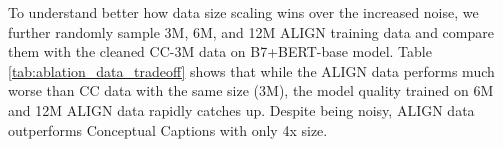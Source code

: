 \documentclass{article}
\begin{document}
\begin{table}[h!]
\vspace{-5mm}
    \centering
    \small
    \caption{Ablation study of different training datasets.}
    \label{tab:ablation_data}
    \vspace{1mm}
\vspace{-3mm}
\end{table}

To understand better how data size scaling wins over the increased noise, we further randomly sample 3M, 6M, and 12M ALIGN training data and compare them with the cleaned CC-3M data on B7+BERT-base model. Table \ref{tab:ablation_data_tradeoff} shows that while the ALIGN data performs much worse than CC data with the same size (3M), the model quality trained on 6M and 12M ALIGN data rapidly catches up. Despite being noisy, ALIGN data outperforms Conceptual Captions with only 4x size.
\end{document}
